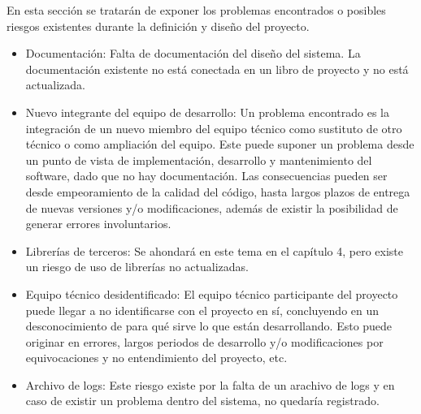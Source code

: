 En esta sección se tratarán de exponer los problemas encontrados o posibles riesgos existentes durante la definición y diseño del proyecto.
\begin{itemize}
    \item Documentación: Falta de documentación del diseño del sistema. La documentación existente no está conectada en un libro de proyecto y no está actualizada.
    \item Nuevo integrante del equipo de desarrollo: Un problema encontrado es la integración de un nuevo miembro del equipo técnico como sustituto de otro técnico o como ampliación del equipo. Este puede suponer un problema desde un punto de vista de implementación, desarrollo y mantenimiento del software, dado que no hay documentación. Las consecuencias pueden ser desde empeoramiento de la calidad del código, hasta largos plazos de entrega de nuevas versiones y/o modificaciones, además de existir la posibilidad de generar errores involuntarios.
    \item Librerías de terceros: Se ahondará en este tema en el capítulo 4, pero existe un riesgo de uso de librerías no actualizadas.
    \item Equipo técnico desidentificado: El equipo técnico participante del proyecto puede llegar a no identificarse con el proyecto en sí, concluyendo en un desconocimiento de para qué sirve lo que están desarrollando. Esto puede originar en errores, largos periodos de desarrollo y/o modificaciones por equivocaciones y no entendimiento del proyecto, etc.
    \item Archivo de logs: Este riesgo existe por la falta de un arachivo de logs y en caso de existir un problema dentro del sistema, no quedaría registrado.
\end{itemize}



